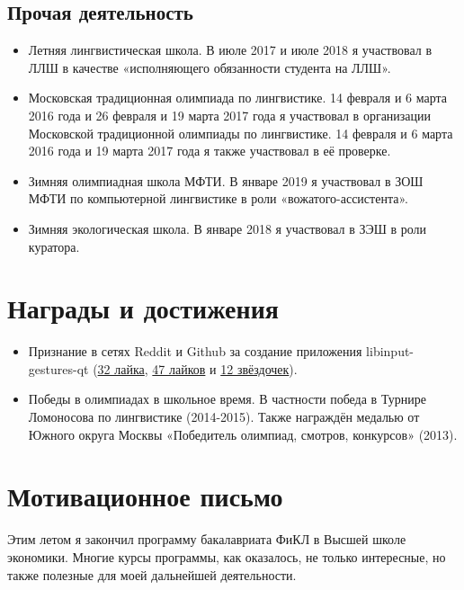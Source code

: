 \documentclass[a4paper,10pt]{article}
\begin{document}
\subsection{Прочая деятельность}
\begin{itemize}
 \item Летняя лингвистическая школа. В июле 2017 и июле 2018 я участвовал в ЛЛШ в качестве «исполняющего обязанности студента на ЛЛШ».
 \item Московская традиционная олимпиада по лингвистике. 14 февраля и 6 марта 2016 года и 26 февраля и 19 марта 2017 года я участвовал в организации Московской традиционной олимпиады по лингвистике. 14 февраля и 6 марта 2016 года и 19 марта 2017 года я также участвовал в её проверке.
 \item Зимняя олимпиадная школа МФТИ. В январе 2019 я участвовал в ЗОШ МФТИ по компьютерной лингвистике в роли «вожатого-ассистента».
 \item Зимняя экологическая школа. В январе 2018 я участвовал в ЗЭШ в роли куратора.
\end{itemize}

\section{Награды и достижения}

\begin{itemize}
 \item Признание в сетях Reddit и Github за создание приложения libinput-gestures-qt
 (\href{https://www.reddit.com/r/openSUSE/comments/bhal2u/qt_frontend_for_libinputgestures/}{32 лайка},
 \href{https://www.reddit.com/r/kde/comments/bhijdw/qt_frontend_for_libinputgestures/}{47 лайков}
 и
 \href{https://github.com/OneAdder/libinput_gestures_qt}{12 звёздочек}).
 \item Победы в олимпиадах в школьное время. В частности победа в Турнире Ломоносова по лингвистике (2014-2015). Также награждён медалью от Южного округа Москвы «Победитель олимпиад, смотров, конкурсов» (2013). 
\end{itemize}


\section{Мотивационное письмо}

Этим летом я закончил программу бакалавриата ФиКЛ в Высшей школе экономики. Многие курсы программы, как оказалось, не только интересные, но также полезные для моей дальнейшей деятельности.
\end{document}
